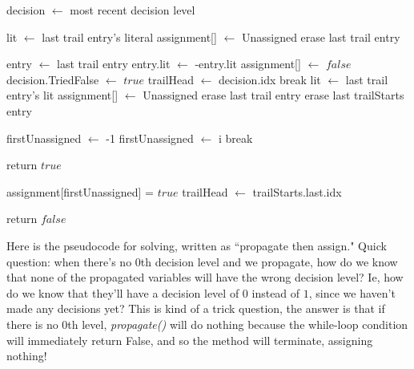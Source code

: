 \begin{algorithm}[H]
\caption{Backtracking code}\label{alg:25}
\begin{algorithmic}[1]

    \State decision $\gets$ most recent decision level

        \State lit $\gets$ last trail entry's literal
        \State assignment[] $\gets$ Unassigned 
        \State erase last trail entry
    \EndWhile

        \State entry $\gets$ last trail entry
        \State entry.lit $\gets$ -entry.lit
        \State assignment[] $\gets$ $false$
        \State decision.TriedFalse $\gets$ $true$
        \State trailHead $\gets$ decision.idx
        \State break
    \Else
        \State lit $\gets$ last trail entry's lit
        \State assignment[] $\gets$ Unassigned 
        \State erase last trail entry
        \State erase last trailStarts entry
    \EndIf
\EndWhile

\EndProcedure
\end{algorithmic}
\end{algorithm}

\begin{algorithm}[H]
\caption{Assignment code}\label{alg:26}
\begin{algorithmic}[1]

\State firstUnassigned $\gets$ -1
        \State firstUnassigned $\gets$ i
        \State break
    \EndIf
\EndFor

    \State return $true$
\EndIf

\State assignment[firstUnassigned] = $true$
\State {}
\State {}
\State trailHead $\gets$ trailStarts.last.idx

\State return $false$

\EndProcedure
\end{algorithmic}
\end{algorithm}

Here is the pseudocode for solving, written as ``propagate then assign." Quick question:
when there's no 0th decision level and we propagate, how do we know that none of the 
propagated variables will have the wrong decision level? Ie, how do we know that they'll 
have a decision level of $0$ instead of $1$, since we haven't made any decisions yet?
This is kind of a trick question, the answer is that if there is no 0th level,
\textit{propagate()} will do nothing because the while-loop condition will immediately 
return False, and so the method will terminate, assigning nothing! 

